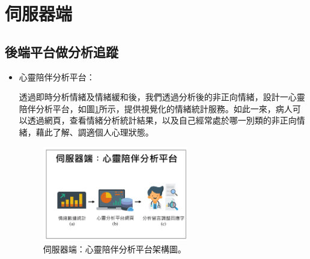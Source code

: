 \documentclass[12pt]{scrreprt}
\begin{document}
\section{伺服器端}

\subsection{後端平台做分析追蹤}
\begin{itemize}
\item{\begin{bfseries}{心靈陪伴分析平台：}\end{bfseries}}透過即時分析情緒及情緒緩和後，我們透過分析後的非正向情緒，設計一心靈陪伴分析平台，如圖\ref{fig:FrameworkThird}所示，提供視覺化的情緒統計服務。如此一來，病人可以透過網頁，查看情緒分析統計結果，以及自己經常處於哪一別類的非正向情緒，藉此了解、調適個人心理狀態。

\begin{figure}[!h]
\begin{center}
\includegraphics[width=0.6\textwidth]{./figs/FrameworkThird.pdf}
\end{center}
\caption{伺服器端：心靈陪伴分析平台架構圖。}
\label{fig:FrameworkThird}
\end{figure}
\end{itemize}
\end{document}
